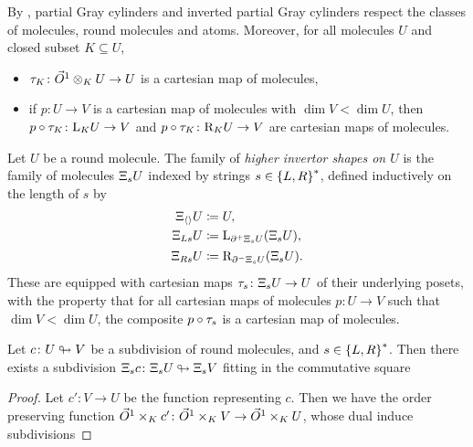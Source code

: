 \begin{rmk} \label{rmk:inverted_cylinder_well_def}
	By \cite[Lemma 1.20, Lemma 1.26]{chanavat2024equivalences}, partial Gray cylinders and inverted partial Gray cylinders respect the classes of molecules, round molecules and atoms.
	Moreover, for all molecules \( U \) and closed subset \( K \subseteq U \),
	\begin{itemize}
		\item \( \tau_K \colon \vec{O}^{1} \otimes_K U \to U \) is a cartesian map of molecules,
		\item if \( p \colon U \to V \) is a cartesian map of molecules with \( \dim V < \dim U \), then \( p \circ \tau_K \colon \mathrm{L}_{K}{U} \to V \) and \( p \circ \tau_K \colon \mathrm{R}_{K}{U} \to V \) are cartesian maps of molecules.
	\end{itemize}
\end{rmk}

\begin{dfn} 
    Let \( U \) be a round molecule.
    The family of \emph{higher invertor shapes on \( U \)} is the family of molecules \( \Xi_{s} U \) indexed by strings \( s \in \left\{ {L, R} \right\}^* \), defined inductively on the length of \( s \) by
    \begin{align*}
        \Xi_{\langle\rangle} U & \coloneqq U, \\
        \Xi_{Ls} U &\coloneqq \mathrm{L}_{\partial_{}^{+} \Xi_{s} U} (\Xi_{s} U), \\
                \Xi_{Rs} U &\coloneqq \mathrm{R}_{\partial_{}^{-} \Xi_{s} U} (\Xi_{s} U).
    \end{align*}
	These are equipped with cartesian maps \( \tau_s \colon \Xi_{s} U \to U \) of their underlying posets, with the property that for all cartesian maps of molecules \( p \colon U \to V \) such that \( \dim V < \dim U \), the composite \( p \circ \tau_s \) is a cartesian map of molecules.
\end{dfn}

\begin{lem} \label{lem:higher_invertor_commute_subdivision} 
    Let \( c \colon U \looparrowright V \) be a subdivision of round molecules, and \( s \in \left\{ {L, R} \right\}^* \).
    Then there exists a subdivision \( \Xi_{s} c \colon \Xi_{s} U \looparrowright \Xi_{s} V \) fitting in the commutative square 
    \begin{center}
    \end{center}
\end{lem}
\begin{proof}
    Let \( c' \colon V \to U \) be the function representing \( c \). 
    Then we have the order preserving function \( \vec{O}^{1} \times_K c' \colon \vec{O}^{1} \times_K V \to \vec{O}^{1} \times_K U \), whose dual induce subdivisions
\end{proof}

